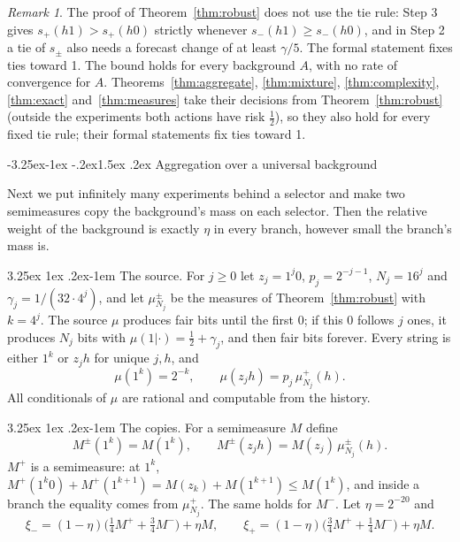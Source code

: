 \documentclass[11pt]{article}
\makeatletter
\renewcommand\subsection{\@startsection{subsection}{2}{\z@}%
  {-3.25ex\@plus -1ex \@minus -.2ex}{1.5ex \@plus .2ex}%
  {\normalfont\large\bfseries\boldmath}}
\renewcommand\paragraph{\@startsection{paragraph}{4}{\z@}%
  {3.25ex \@plus1ex \@minus.2ex}{-1em}%
  {\normalfont\normalsize\bfseries\boldmath}}
\theoremstyle{definition}
\theoremstyle{remark}
\newtheorem{remark}[theorem]{Remark}
\makeatother
\begin{document}
\begin{remark}
The proof of Theorem~\ref{thm:robust} does not use the tie rule: Step 3 gives
$s_+(h1)>s_+(h0)$ strictly whenever $s_-(h1)\ge s_-(h0)$, and in Step 2 a tie
of $s_\pm$ also needs a forecast change of at least $\gamma/5$. The formal
statement fixes ties toward 1. The bound holds for every background $A$, with
no rate of convergence for $A$. Theorems~\ref{thm:aggregate},
\ref{thm:mixture}, \ref{thm:complexity}, \ref{thm:exact} and~\ref{thm:measures} take their decisions from
Theorem~\ref{thm:robust} (outside the experiments both actions have risk
$\frac12$), so they also hold for every fixed tie rule; their formal
statements fix ties toward 1.
\end{remark}

\subsection{Aggregation over a universal background}\label{sec:33aggregate}

Next we put infinitely many experiments behind a selector and make two
semimeasures copy the background's mass on each selector. Then the relative
weight of the background is exactly $\eta$ in every branch, however small the
branch's mass is.

\paragraph{The source.}
For $j\ge0$ let $z_j=1^j0$, $p_j=2^{-j-1}$, $N_j=16^j$ and $\gamma_j=1/(32\cdot4^j)$,
and let $\mu^\pm_{N_j}$ be the measures of
Theorem~\ref{thm:robust} with $k=4^j$. The source $\mu$ produces fair bits
until the first $0$; if this $0$ follows $j$ ones, it produces $N_j$ bits with
$\mu(1|\cdot)=\frac12+\gamma_j$, and then fair bits forever. Every string is
either $1^k$ or $z_jh$ for unique $j,h$, and
\[
\mu(1^k)=2^{-k},\qquad \mu(z_jh)=p_j\,\mu^+_{N_j}(h).
\]
All conditionals of $\mu$ are rational and computable from the history.

\paragraph{The copies.}
For a semimeasure $M$ define
\[
M^\pm(1^k)=M(1^k),\qquad M^\pm(z_jh)=M(z_j)\,\mu^\pm_{N_j}(h).
\]
$M^+$ is a semimeasure: at $1^k$,
$M^+(1^k0)+M^+(1^{k+1})=M(z_k)+M(1^{k+1})\le M(1^k)$, and inside a branch the
equality comes from $\mu^+_{N_j}$. The same holds for $M^-$. Let $\eta=2^{-20}$ and
\[
\xi_-=(1-\eta)\bigl(\tfrac14M^{+}+\tfrac34M^{-}\bigr)+\eta M,\qquad
\xi_+=(1-\eta)\bigl(\tfrac34M^{+}+\tfrac14M^{-}\bigr)+\eta M .
\]
\end{document}
